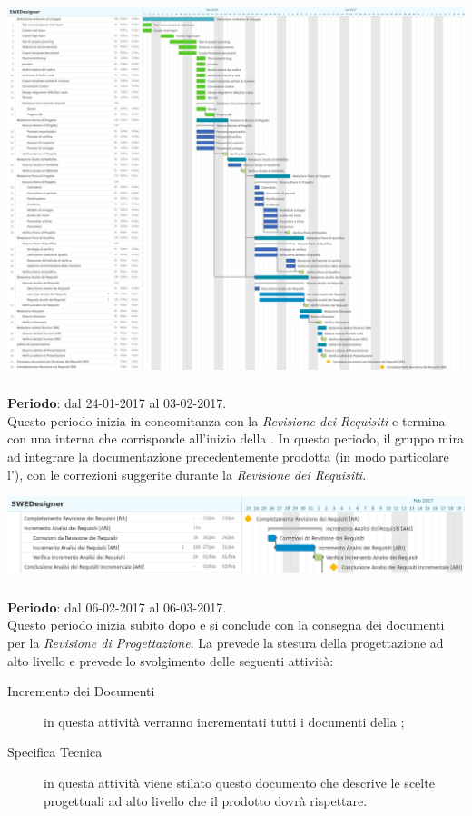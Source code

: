 {\includegraphics[width=16cm]{img/ganttan.jpg}\par}
		

	\subsubsection{\ARI} \label{sec:ARI}
	\textbf{Periodo}: dal 24-01-2017 al 03-02-2017.
	\\ Questo periodo inizia in concomitanza con la \emph{Revisione dei Requisiti} e termina con una  interna che corrisponde all'inizio della \PA. In questo periodo, il gruppo mira ad integrare la documentazione precedentemente prodotta (in modo particolare l'\AR), con le correzioni suggerite durante la \emph{Revisione dei Requisiti}.

{\includegraphics[width=15cm]{img/ganttari.png}\par}

	
	\subsubsection{\PA} \label{sec:PA}
	\textbf{Periodo}: dal 06-02-2017 al 06-03-2017.	
	\\ Questo periodo inizia subito dopo \ARI{} e si conclude con la consegna dei documenti per la \emph{Revisione di Progettazione}. La \PA{} prevede la stesura della progettazione ad alto  livello e prevede lo svolgimento delle seguenti attività:
	\begin{description}
		\item[Incremento dei Documenti] in questa attività verranno incrementati tutti i documenti della \PA{};
		\item[Specifica Tecnica] in questa attività viene stilato questo documento che descrive le scelte progettuali ad alto livello che il prodotto dovrà rispettare.
	\end{description}


